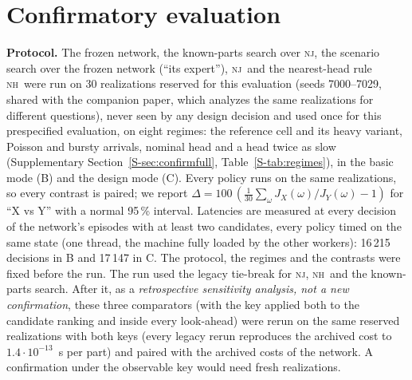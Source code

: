 \documentclass[11pt,a4paper]{article}
\theoremstyle{plain}
\theoremstyle{definition}
\theoremstyle{remark}
\newcommand{\nj}{\textsc{nj}}
\newcommand{\nh}{\textsc{nh}}
\newcommand{\Supp}[1]{Supplementary Section~\ref{S-#1}}
\begin{document}
\section{Confirmatory evaluation}\label{sec:confirm}
\textbf{Protocol.} The frozen network, the known-parts search over \nj, the scenario search
over the frozen network (``its expert''), \nj\ and the nearest-head rule \nh\ were run on 30
realizations reserved for this evaluation (seeds 7000--7029, shared with the companion
paper, which analyzes the same realizations for different questions), never seen by any
design decision and used once for this prespecified evaluation, on eight regimes: the
reference cell and its heavy variant, Poisson and bursty arrivals, nominal head and a head
twice as slow (\Supp{sec:confirmfull}, Table~\ref{S-tab:regimes}), in the basic mode (B)
and the design mode (C). Every policy runs on the same realizations, so every contrast is
paired; we report $\Delta=100\,(\frac{1}{30}\sum_\omega J_X(\omega)/J_Y(\omega)-1)$ for ``X vs
Y'' with a normal 95\,\% interval. Latencies are measured at every decision of the
network's episodes with at least two candidates, every policy timed on the same state (one
thread, the machine fully loaded by the other workers): 16\,215 decisions in B and 17\,147
in C. The protocol, the regimes and the contrasts were fixed before the run. The run used
the legacy tie-break for \nj, \nh\ and the known-parts search. After it, as a
\emph{retrospective sensitivity analysis, not a new confirmation}, these three comparators
(with the key applied both to the candidate ranking and inside every look-ahead) were rerun
on the same reserved realizations with both keys (every legacy rerun reproduces the
archived cost to $1.4\cdot10^{-13}$~s per part) and paired with the archived costs of the
network. A confirmation under the observable key would need fresh realizations.

\begin{table}[t]
\centering\small
\caption{Confirmatory evaluation, basic mode (B): paired $\Delta$ of the penalized flow
time of each policy against \nj; contrasts of the two searches against the network
(positive = the network is better; in parentheses the realizations in which the search is
cheaper); and per-decision latency (median / 95th percentile). Bold: the individual
interval excludes zero. Prespecified run: rules and known-parts search with the legacy
arrival-time tie-break. Seeds 7000--7029, shared with the companion paper.}
\label{tab:confirmB}
\resizebox{\linewidth}{!}{}
\end{table}
\end{document}
